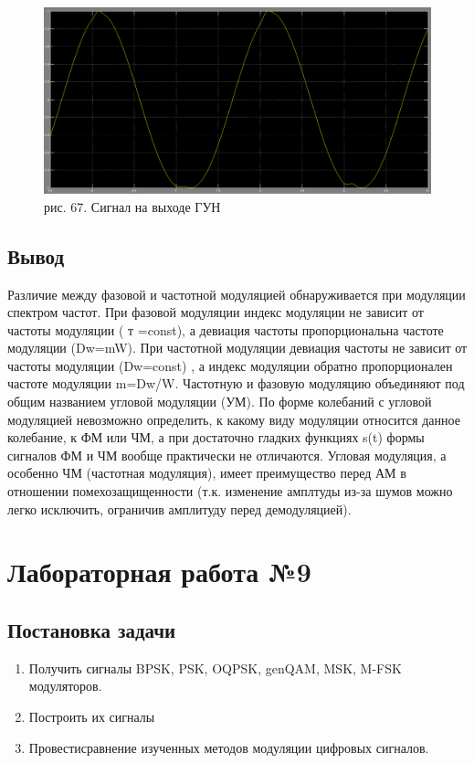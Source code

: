 \documentclass[10pt,a4paper]{report}
\begin{document}
\begin{figure}
\begin{center}
\includegraphics[width=150mm, scale = 0.9]{8_17}\newline
рис. 67. Сигнал на выходе ГУН\newline
\end{center}
\end{figure}
\section{Вывод}
Различие между фазовой и частотной модуляцией обнаруживается при модуляции спектром частот. При фазовой модуляции индекс модуляции не зависит от частоты модуляции ( т =const), а девиация частоты пропорциональна частоте модуляции (Dw=mW). При частотной модуляции девиация частоты не зависит от частоты модуляции (Dw=const) , а индекс модуляции обратно пропорционален частоте модуляции m=Dw/W.
Частотную и фазовую модуляцию объединяют под общим названием угловой модуляции (УМ). По форме колебаний с угловой модуляцией невозможно определить, к какому виду модуляции относится данное колебание, к ФМ или ЧМ, а при достаточно гладких функциях s(t) формы сигналов ФМ и ЧМ вообще практически не отличаются.
Угловая модуляция, а особенно ЧМ (частотная модуляция), имеет преимущество перед АМ в 
отношении помехозащищенности (т.к. изменение амплтуды из-за шумов можно легко исключить, ограничив амплитуду перед демодуляцией).
\chapter{Лабораторная работа №9}
\section{Постановка задачи}
\begin{enumerate}
\item 
Получить сигналы BPSK, PSK, OQPSK, genQAM, MSK, M-FSK модуляторов.
\item
Построить их сигналы
\item
Провестисравнение изученных методов модуляции цифровых сигналов.
\end{enumerate}
\end{document}
